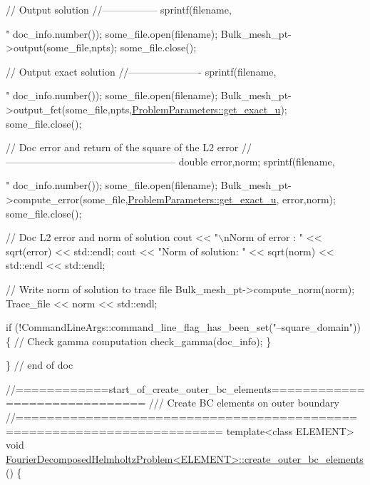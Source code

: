 \begin{DoxyCodeInclude}
{ \textcolor{comment}{// Output solution }
 \textcolor{comment}{//-----------------}
 sprintf(filename,\textcolor{stringliteral}{"%
         doc\_info.number());
 some\_file.open(filename);
 Bulk\_mesh\_pt->output(some\_file,npts);
 some\_file.close();


 \textcolor{comment}{// Output exact solution }
 \textcolor{comment}{//----------------------}
 sprintf(filename,\textcolor{stringliteral}{"%
         doc\_info.number());
 some\_file.open(filename);
 Bulk\_mesh\_pt->output\_fct(some\_file,npts,\hyperlink{namespaceProblemParameters_af750b29069b29bd38b5220ecf534e7f7}{ProblemParameters::get\_exact\_u}); 
 some\_file.close();
 
 
 \textcolor{comment}{// Doc error and return of the square of the L2 error}
 \textcolor{comment}{//---------------------------------------------------}
 \textcolor{keywordtype}{double} error,norm;
 sprintf(filename,\textcolor{stringliteral}{"%
         doc\_info.number());
 some\_file.open(filename);
 Bulk\_mesh\_pt->compute\_error(some\_file,\hyperlink{namespaceProblemParameters_af750b29069b29bd38b5220ecf534e7f7}{ProblemParameters::get\_exact\_u},
                             error,norm); 
 some\_file.close();
 
 \textcolor{comment}{// Doc L2 error and norm of solution}
 cout << \textcolor{stringliteral}{"\(\backslash\)nNorm of error   : "} << sqrt(error) << std::endl; 
 cout << \textcolor{stringliteral}{"Norm of solution: "} << sqrt(norm) << std::endl << std::endl;
 

 \textcolor{comment}{// Write norm of solution to trace file}
 Bulk\_mesh\_pt->compute\_norm(norm); 
 Trace\_file  << norm << std::endl;


 \textcolor{keywordflow}{if} (!CommandLineArgs::command\_line\_flag\_has\_been\_set(\textcolor{stringliteral}{"--square\_domain"}))
  \{
   \textcolor{comment}{// Check gamma computation}
   check\_gamma(doc\_info);
  \}

\} \textcolor{comment}{// end of doc}



\textcolor{comment}{//============start\_of\_create\_outer\_bc\_elements==============================}\textcolor{comment}{}
\textcolor{comment}{/// Create BC elements on outer boundary}
\textcolor{comment}{}\textcolor{comment}{//========================================================================}
\textcolor{keyword}{template}<\textcolor{keyword}{class} ELEMENT>
\textcolor{keywordtype}{void} \hyperlink{classFourierDecomposedHelmholtzProblem_a359d402bb4aed7d83973248d82085efb}{FourierDecomposedHelmholtzProblem<ELEMENT>::create\_outer\_bc\_elements}
      ()
\{

}}}}
\end{DoxyCodeInclude}
